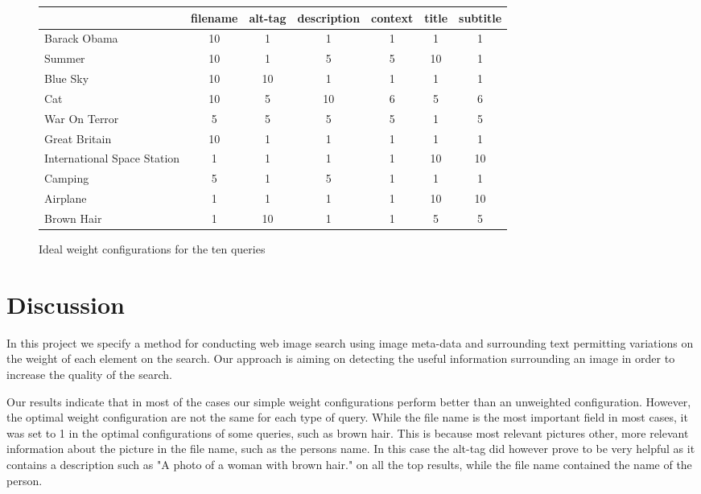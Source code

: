 \documentclass[a4paper]{article}
\begin{document}
\begin{figure}
\begin{center}
\begin{tabular}{| l || c | c | c | c | c | c |}
\hline
                                 		& filename & alt-tag & description & context & title & subtitle \\ \hline
 Barack Obama   		& 10 & 1 & 1 & 1 & 1 & 1 \\ \hline
 Summer   				& 10 & 1 & 5 & 5 & 10 & 1\\ \hline 
 Blue Sky 				& 10 & 10 & 1 & 1 & 1 & 1\\ \hline 
 Cat 					& 10 & 5 & 10 & 6 & 5 & 6\\ \hline 
 War On Terror 			& 5 & 5 & 5 & 5 & 1 & 5\\ \hline
 Great Britain 			& 10 & 1 & 1 & 1 & 1 & 1\\ \hline
 International Space Station& 1 & 1 & 1& 1& 10 & 10\\ \hline
 Camping 				& 5 & 1 & 5 & 1 & 1 & 1\\ \hline
 Airplane 				& 1 & 1 & 1 & 1 & 10 & 10\\ \hline
 Brown Hair 			& 1 & 10 & 1 & 1 & 5 & 5\\ \hline
\hline
\end{tabular}
\caption{Ideal weight configurations for the ten queries}
\label{optvect}
\end{center}
\end{figure}

\section{Discussion}

In this project we specify a method for conducting web image search using image meta-data and surrounding text permitting variations on the weight of each element on the search. Our approach is aiming on detecting the useful information surrounding an image in order to increase the quality of the search.

Our results indicate that in most of the cases our simple weight configurations perform better than an unweighted configuration. However, the optimal weight configuration are not the same for each type of query. While the file name is the most important field in most cases, it was set to 1 in the optimal configurations of some queries, such as brown hair. This is because most relevant pictures other, more relevant information about the picture in the file name, such as the persons name. In this case the alt-tag did however prove to be very helpful as it contains a description such as "A photo of a woman with brown hair." on all the top results, while the file name contained the name of the person.
\end{document}
